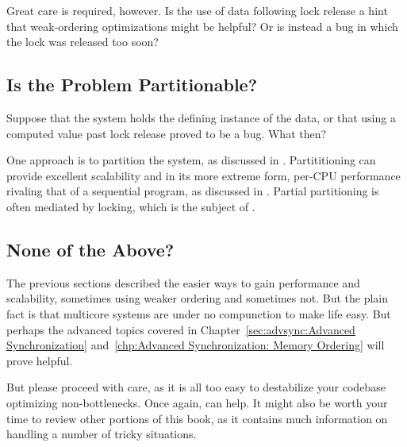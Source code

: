 Great care is required, however.
Is the use of data following lock release a hint that weak-ordering
optimizations might be helpful?
Or is instead a bug in which the lock was released too soon?

\subsection{Is the Problem Partitionable?}
\label{sec:app:questions:Is the Problem Partitionable?}

Suppose that the system holds the defining instance of the data,
or that using a computed value past lock release proved to be a bug.
What then?

One approach is to partition the system, as discussed in
.
Partititioning can provide excellent scalability and in its more
extreme form, per-CPU performance rivaling that of a sequential program,
as discussed in .
Partial partitioning is often mediated by locking, which is the subject of
.

\subsection{None of the Above?}
\label{sec:app:questions:None of the Above?}

The previous sections described the easier ways to gain performance
and scalability, sometimes using weaker ordering and sometimes not.
But the plain fact is that multicore systems are under no compunction
to make life easy.
But perhaps the advanced topics covered in
Chapter~\ref{sec:advsync:Advanced Synchronization}
and~\ref{chp:Advanced Synchronization: Memory Ordering}
will prove helpful.

But please proceed with care, as it is all too easy to destabilize
your codebase optimizing non-bottlenecks.
Once again,  can help.
It might also be worth your time to review other portions of this
book, as it contains much information on handling a number of tricky
situations.
